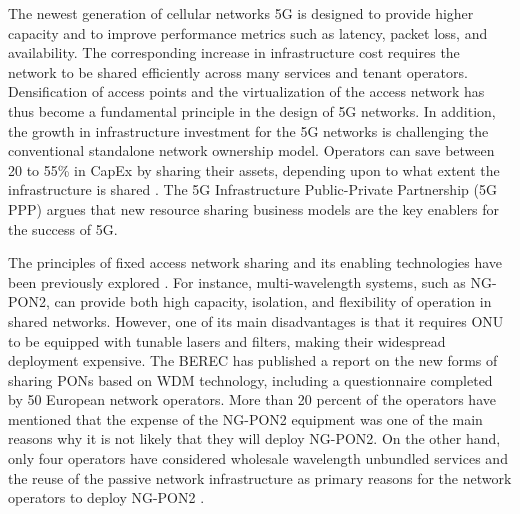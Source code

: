 The newest generation of cellular networks \ac{5G} is designed to provide higher capacity and to improve performance metrics such as latency, packet loss, and availability. The corresponding increase in infrastructure cost requires the network to be shared efficiently across many services and tenant operators. Densification of access points and the virtualization of the access network has thus become a fundamental principle in the design of \ac{5G} networks. 
In addition, the growth in infrastructure investment for the \ac{5G} networks is challenging the conventional standalone network ownership model. Operators can save between 20 to 55\% in \ac{CapEx} by sharing their assets, depending upon to what extent the infrastructure is shared \cite{MEDDOUR20111576}. The \ac{5G} Infrastructure Public-Private Partnership (5G PPP) \cite{5gpp} argues that new resource sharing business models are the key enablers for the success of \ac{5G}.





The principles of fixed access network sharing and its enabling technologies have been previously explored \cite{Nima-5g-evol}. For instance, multi-wavelength systems, such as \ac{NG-PON2}, can provide both high capacity, isolation, and flexibility of operation in shared networks.  %
However, one of its main disadvantages is that it requires \ac{ONU} to be equipped with tunable lasers and filters, making their widespread deployment expensive. The \ac{BEREC} has published a report \cite{BEREC} on the new forms of sharing \acp{PON} based on \ac{WDM} technology, including a questionnaire completed by 50 European network operators. More than 20 percent of the operators have mentioned that the expense of the \ac{NG-PON2} equipment was one of the main reasons why it is not likely that they will deploy \ac{NG-PON2}. On the other hand, only four operators have considered wholesale wavelength unbundled services and the reuse of the passive network infrastructure as primary reasons for the network operators to deploy \ac{NG-PON2} \cite{BEREC}. %

